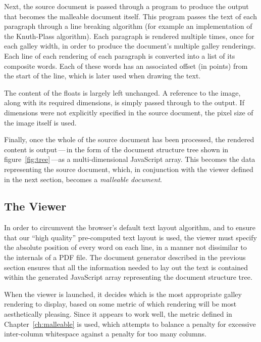 Next, the source document is passed through a program to produce the output that becomes the malleable document itself. This program passes the text of each paragraph through a line breaking algorithm (for example an implementation of the Knuth-Plass algorithm). Each paragraph is rendered multiple times, once for each galley width, in order to produce the document's multiple galley renderings. Each line of each rendering of each paragraph is converted into a list of its composite words. Each of these words has an associated offset (in points) from the start of the line, which is later used when drawing the text.

The content of the floats is largely left unchanged. A reference to the image, along with its required dimensions, is simply passed through to the output. If dimensions were not explicitly specified in the source document, the pixel size of the image itself is used.

Finally, once the whole of the source document has been processed, the rendered content is output\,---\,in the form of the document structure tree shown in figure~\ref{fig:tree}\,---as a multi-dimensional JavaScript array. This becomes the data representing the source document, which, in conjunction with the viewer defined in the next section, becomes a \emph{malleable document}.




\subsection{The Viewer}
\label{sec:viewer}

In order to circumvent the browser's default text layout algorithm, and to ensure that our ``high quality'' pre-computed text layout is used, the viewer must specify the absolute position of every word on each line, in a manner not dissimilar to the internals of a PDF file. The document generator described in the previous section ensures that all the information needed to lay out the text is contained within the generated JavaScript array representing the document structure tree.


When the viewer is launched, it decides which is the most appropriate galley rendering to display, based on some metric of which rendering will be most aesthetically pleasing. Since it appears to work well, the metric defined in Chapter~\ref{ch:malleable} is used, which attempts to balance a penalty for excessive inter-column whitespace against a penalty for too many columns. 


